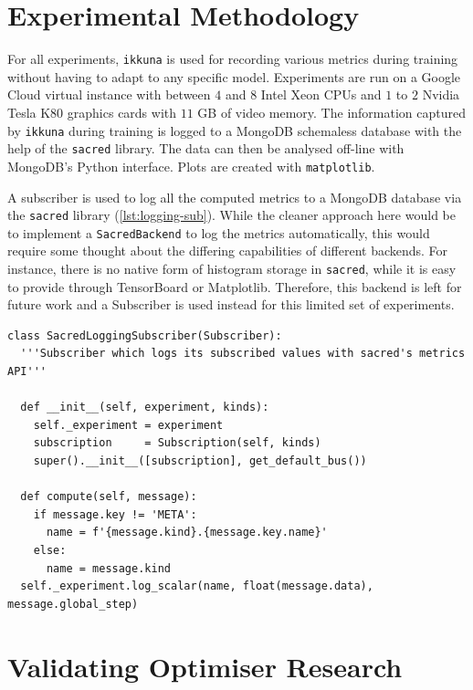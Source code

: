 \section{Experimental Methodology}%
\label{sec:experimental_methodology}

For all experiments, \texttt{ikkuna} is used for recording various metrics
during training without having to adapt to any specific model. Experiments are
run on a Google Cloud virtual instance with between $4$ and $8$ Intel Xeon CPUs
and $1$ to $2$  Nvidia Tesla K80 graphics cards with $11$ GB of video memory. The
information captured by \texttt{ikkuna} during training is logged to a MongoDB
schemaless database with the help of the \texttt{sacred} library. The data can
then be analysed off-line with MongoDB's Python interface. Plots are created
with \texttt{matplotlib}. %

A subscriber is used to log all the computed metrics to a MongoDB database via
the \texttt{sacred} library (\cref{lst:logging-sub}). While the cleaner approach
here would be to implement a \texttt{SacredBackend} to log the metrics
automatically, this would require some thought about the differing capabilities
of different backends. For instance, there is no native form of histogram
storage in \texttt{sacred}, while it is easy to provide through TensorBoard or
Matplotlib. Therefore, this backend is left for future work and a Subscriber is
used instead for this limited set of experiments.

\begin{lstlisting}[label={lst:logging.sub},
caption={Subscriber for logging metrics}]
class SacredLoggingSubscriber(Subscriber):
  '''Subscriber which logs its subscribed values with sacred's metrics API'''

  def __init__(self, experiment, kinds):
    self._experiment = experiment
    subscription     = Subscription(self, kinds)
    super().__init__([subscription], get_default_bus())

  def compute(self, message):
    if message.key != 'META':
      name = f'{message.kind}.{message.key.name}'
    else:
      name = message.kind
  self._experiment.log_scalar(name, float(message.data), message.global_step)
\end{lstlisting}


\section{Validating Optimiser Research}%
\label{sec:adam}

